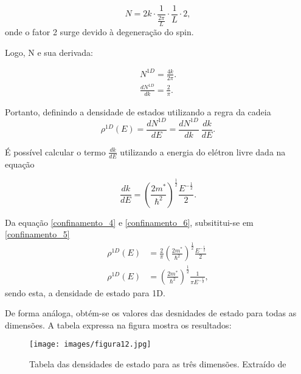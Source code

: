\begin{equation}
	\label{confinamento_3}
	N = 2k \cdot \frac{1}{\frac{2\pi}{L}} \cdot \frac{1}{L} \cdot 2,
\end{equation}
onde o fator 2 surge devido à degeneração do spin.

\par Logo, N e sua derivada:

\begin{align}
	\label{confinamento_4}
	N^{1D} = \frac{4k}{2\pi}.\\
	\frac{dN^{1D}}{dk} = \frac{2}{\pi}
	.		
\end{align}

\par Portanto, definindo a densidade de estados utilizando a regra da cadeia
\begin{equation}
	\label{confinamento_5}
	\rho^{1D}(E) = \frac{dN^{1D}}{dE} = \frac{dN^{1D}}{dk}\ \frac{dk}{dE}.
\end{equation}

\par É possível calcular o termo $\frac{dk}{dE}$ utilizando a energia do elétron livre dada na equação\cite{confinamento3}

\begin{equation}
	\label{confinamento_6}
	 \frac{dk}{dE} = \left(\frac{2m^{\ast}}{\hbar^2}\right)^{\frac{1}{2}} \frac{E^{-\frac{1}{2}}}{2}.
\end{equation}

\par Da equação \eqref{confinamento_4} e \eqref{confinamento_6}, subsititui-se em \eqref{confinamento_5}
\begin{align}
	\label{confinamento_7}
	\rho^{1D}(E) &= \frac{2}{\pi} \left(\frac{2m^{\ast}}{\hbar^2}\right)^{\frac{1}{2}} \frac{E^{-\frac{1}{2}}}{2}\\
	\rho^{1D}(E) &= \left(\frac{2m^{\ast}}{\hbar^2}\right)^{\frac{1}{2}} \frac{1}{\pi E^{-\frac{1}{2}}},
\end{align}
sendo esta, a densidade de estado para 1D.

\par De forma análoga, obtém-se os valores das desnidades de estado para todas as dimensões. A tabela expressa na figura mostra os resultados:

\begin{figure}[H]
  \caption{Tabela das densidades de estado para as três dimensões. Extraído de \cite{confinamento3}}
  \centering
  \texttt{[image: images/figura12.jpg]}
  \label{fig12}
\end{figure}

